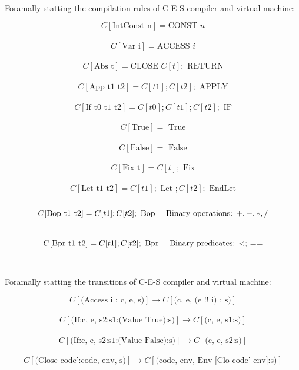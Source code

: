 \documentclass[10pt]{article}
\begin{document}
\paragraph{}
Foramally statting the compilation rules of C-E-S compiler and virtual machine:

\[
	C[\text{IntConst n}] = \text{CONST } n
\]
\ \\
\[
        C[\text{Var i}] = \text{ACCESS } i
\]
\ \\
\[
	C[\text{Abs t}] = \text{CLOSE } C[t]; \text{ RETURN}
\]
\ \\
\[
	C[\text{App t1 t2}] = C[t1]; C[t2]; \text{ APPLY}
\]
\ \\
\[
	C[\text{If t0 t1 t2}] = C[t0]; C[t1]; C[t2]; \text{ IF}
\]
\ \\
\[
	C[\text{True}] = \text{ True}
\]
\ \\
\[
	C[\text{False}] = \text{ False}
\]
\ \\
\[
	C[\text{Fix t}] = C[t]; \text{ Fix}
\]
\ \\
\[
	C[\text{Let t1 t2}] = C[t1]; \text{ Let }; C[t2]; \text{ EndLet} 
\]
\ \\
\[
	C[\text{Bop t1 t2}] = C[t1]; C[t2]; \text{ Bop} \text{\quad -Binary operations: $+, -, *, /$}  
\]
\ \\
\[
	C[\text{Bpr t1 t2}] = C[t1]; C[t2]; \text{ Bpr} \text{\quad -Binary predicates: $<$; $==$}  
\]
\ \\

\paragraph{}
Foramally statting the transitions of C-E-S compiler and virtual machine:

\[
	C[\text{(Access i : c, e, s)}] \rightarrow C[\text{(c, e, (e !! i) : s)}]  
\]
\ \\
\[
	C[\text{(If:c, e, s2:s1:(Value True):s)}] \rightarrow C[\text{(c, e, s1:s)}]  
\]
\ \\
\[
	C[\text{(If:c, e, s2:s1:(Value False):s)}] \rightarrow C[\text{(c, e, s2:s)}]  
\]
\ \\

\[
	C[\text{(Close code':code, env, s)}] \rightarrow C[\text{(code, env, Env [Clo code' env]:s)}]  
\]
\ \\
\end{document}
